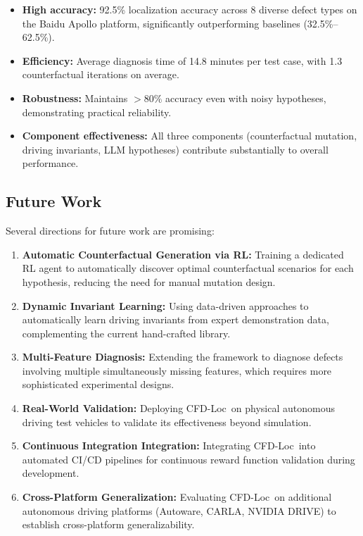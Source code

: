 \documentclass[conference]{IEEEtran}
\theoremstyle{plain}
\newcommand{\methodname}{CFD-Loc}
\begin{document}
\begin{itemize}[nosep]
    \item \textbf{High accuracy:} 92.5\% localization accuracy across 8 diverse defect types on the Baidu Apollo platform, significantly outperforming baselines (32.5\%--62.5\%).
    \item \textbf{Efficiency:} Average diagnosis time of 14.8 minutes per test case, with 1.3 counterfactual iterations on average.
    \item \textbf{Robustness:} Maintains $>80\%$ accuracy even with noisy hypotheses, demonstrating practical reliability.
    \item \textbf{Component effectiveness:} All three components (counterfactual mutation, driving invariants, LLM hypotheses) contribute substantially to overall performance.
\end{itemize}

\subsection{Future Work}

Several directions for future work are promising:

\begin{enumerate}
    \item \textbf{Automatic Counterfactual Generation via RL:} Training a dedicated RL agent to automatically discover optimal counterfactual scenarios for each hypothesis, reducing the need for manual mutation design.
    \item \textbf{Dynamic Invariant Learning:} Using data-driven approaches to automatically learn driving invariants from expert demonstration data, complementing the current hand-crafted library.
    \item \textbf{Multi-Feature Diagnosis:} Extending the framework to diagnose defects involving multiple simultaneously missing features, which requires more sophisticated experimental designs.
    \item \textbf{Real-World Validation:} Deploying \methodname\ on physical autonomous driving test vehicles to validate its effectiveness beyond simulation.
    \item \textbf{Continuous Integration Integration:} Integrating \methodname\ into automated CI/CD pipelines for continuous reward function validation during development.
    \item \textbf{Cross-Platform Generalization:} Evaluating \methodname\ on additional autonomous driving platforms (Autoware, CARLA, NVIDIA DRIVE) to establish cross-platform generalizability.
\end{enumerate}
\end{document}

